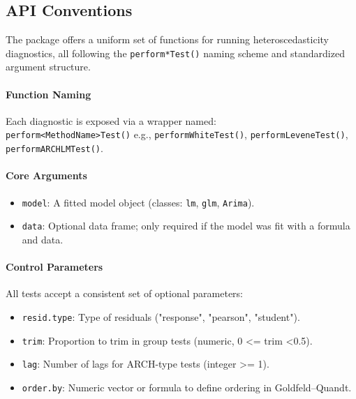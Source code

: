 \subsection{API Conventions}\label{sec:api-conventions}
The  package offers a uniform set of functions for running heteroscedasticity diagnostics, all following the \texttt{perform*Test()} naming scheme and standardized argument structure.

\paragraph{Function Naming}
Each diagnostic is exposed via a wrapper named:\\
\texttt{perform<MethodName>Test()} e.g., \texttt{performWhiteTest()}, \texttt{performLeveneTest()}, \texttt{performARCHLMTest()}.

\paragraph{Core Arguments}
\begin{itemize}
  \item \texttt{model}: A fitted model object (classes: \texttt{lm}, \texttt{glm}, \texttt{Arima}).
  \item \texttt{data}: Optional data frame; only required if the model was fit with a formula and data.
\end{itemize}

\paragraph{Control Parameters}
All tests accept a consistent set of optional parameters:
\begin{itemize}
  \item \texttt{resid.type}: Type of residuals ("response", "pearson", "student").
  \item \texttt{trim}: Proportion to trim in group tests (numeric, 0 \textless= trim \textless 0.5).
  \item \texttt{lag}: Number of lags for ARCH-type tests (integer \textgreater= 1).
  \item \texttt{order.by}: Numeric vector or formula to define ordering in Goldfeld--Quandt.
\end{itemize}

